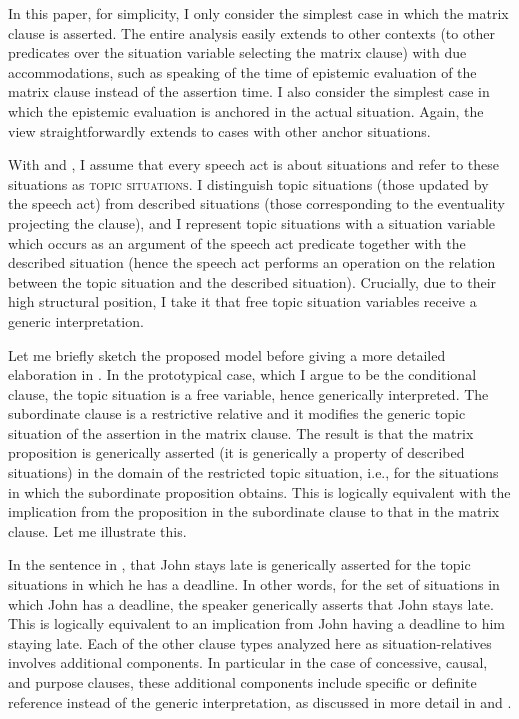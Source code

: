 \documentclass[output=paper]{langscibook}
\begin{document}
\noindent In this paper, for simplicity, I only consider the simplest case in which the matrix clause is asserted. The entire analysis easily extends to other contexts (to other predicates over the situation variable selecting the matrix clause) with due accommodations, such as speaking of the time of epistemic evaluation of the matrix clause instead of the assertion time. I also consider the simplest case in which the epistemic evaluation is anchored in the actual situation. Again, the view straightforwardly extends to cases with other anchor situations.

With \citet{Barwise.Perry1983} and \citet{Kratzer2010}, I assume that every speech act is about situations and refer to these situations as \textsc{topic situations}. I distinguish topic situations (those updated by the speech act) from described situations (those corresponding to the eventuality projecting the clause), and I represent topic situations with a situation variable which occurs as an argument of the speech act predicate together with the described situation (hence the speech act performs an operation on the relation between the topic situation and the described situation). Crucially, due to their high structural position, I take it that free topic situation variables receive a generic interpretation.

Let me briefly sketch the proposed model before giving a more detailed elaboration in . In the prototypical case, which I argue to be the conditional clause, the topic situation is a free variable, hence generically interpreted. The subordinate clause is a restrictive relative and it modifies the generic topic situation of the assertion in the matrix clause. The result is that the matrix proposition is generically asserted (it is generically a property of described situations) in the domain of the restricted topic situation, i.e., for the situations in which the subordinate proposition obtains. This is logically equivalent with the implication from the proposition in the subordinate clause to that in the matrix clause. Let me illustrate this.

In the sentence in , that John stays late is generically asserted for the topic situations in which he has a deadline. In other words, for the set of situations in which John has a deadline, the speaker generically asserts that John stays late. This is logically equivalent to an implication from John having a deadline to him staying late. Each of the other clause types analyzed here as situation-relatives involves additional components. In particular in the case of concessive, causal, and purpose clauses, these additional components include specific or definite reference instead of the generic interpretation, as discussed in more detail in  and .\largerpage
\end{document}
